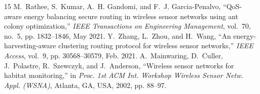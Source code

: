 \documentclass[journal]{IEEEtran}
\begin{document}
\begin{thebibliography}{15}
M.~Rathee, S.~Kumar, A.~H. Gandomi, and F.~J. Garcia-Penalvo, ``QoS-aware energy balancing secure routing in wireless sensor networks using ant colony optimization,'' \textit{IEEE Transactions on Engineering Management}, vol.~70, no.~5, pp. 1832--1846, May 2021.
Y.~Zhang, L.~Zhou, and H.~Wang, ``An energy-harvesting-aware clustering routing protocol for wireless sensor networks,'' \textit{IEEE Access}, vol.~9, pp. 30568--30579, Feb. 2021.
A.~Mainwaring, D.~Culler, J.~Polastre, R.~Szewczyk, and J.~Anderson, ``Wireless sensor networks for habitat monitoring,'' in \textit{Proc. 1st ACM Int. Workshop Wireless Sensor Netw. Appl. (WSNA)}, Atlanta, GA, USA, 2002, pp. 88--97.
\end{thebibliography}
\end{document}
